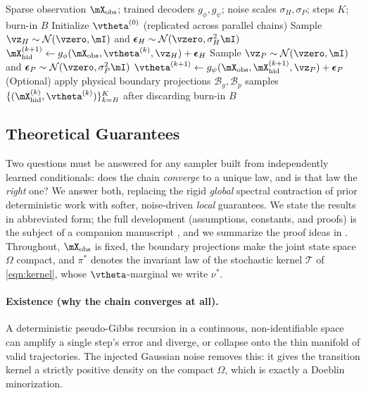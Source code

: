 \begin{algorithm}[htbp]
\caption{Stochastic Pseudo-Gibbs Inference}
\label{alg:pseudo_gibbs}
\begin{algorithmic}[1]
\REQUIRE Sparse observation $\mX_{\mathrm{obs}}$; trained decoders $g_\phi, g_\psi$; noise scales $\sigma_H, \sigma_P$; steps $K$; burn-in $B$
\STATE Initialize $\vtheta^{(0)}$ (replicated across parallel chains)
\STATE Sample $\vz_H \sim \mathcal{N}(\vzero, \mI)$ and $\boldsymbol{\epsilon}_H \sim \mathcal{N}(\vzero, \sigma_H^2 \mI)$
\STATE $\mX_{\mathrm{hid}}^{(k+1)} \leftarrow g_\phi(\mX_{\mathrm{obs}}, \vtheta^{(k)}, \vz_H) + \boldsymbol{\epsilon}_H$
\STATE Sample $\vz_P \sim \mathcal{N}(\vzero, \mI)$ and $\boldsymbol{\epsilon}_P \sim \mathcal{N}(\vzero, \sigma_P^2 \mI)$
\STATE $\vtheta^{(k+1)} \leftarrow g_\psi(\mX_{\mathrm{obs}}, \mX_{\mathrm{hid}}^{(k+1)}, \vz_P) + \boldsymbol{\epsilon}_P$
\STATE (Optional) apply physical boundary projections $\mathcal{B}_y, \mathcal{B}_p$
\ENDFOR
\RETURN samples $\{(\mX_{\mathrm{hid}}^{(k)}, \vtheta^{(k)})\}_{k=B}^{K}$ after discarding burn-in $B$
\end{algorithmic}
\end{algorithm}

\subsection{Theoretical Guarantees}
\label{subsec:theory}

Two questions must be answered for any sampler built from independently learned conditionals: does
the chain \emph{converge} to a unique law, and is that law the \emph{right} one? We answer both,
replacing the rigid \emph{global} spectral contraction of prior deterministic work with softer,
noise-driven \emph{local} guarantees. We state the results in abbreviated form; the full development
(assumptions, constants, and proofs) is the subject of a companion manuscript
\citep{adcvae-theory}, and we summarize the proof ideas in . Throughout, $\xobs$
is fixed, the boundary projections make the joint state space $\Omega$ compact, and $\pi^\ast$
denotes the invariant law of the stochastic kernel $\mathcal{T}$ of \eqref{eqn:kernel}, whose
$\vtheta$-marginal we write $\nu^\ast$.

\paragraph{Existence (why the chain converges at all).}
A deterministic pseudo-Gibbs recursion in a continuous, non-identifiable space can amplify a single
step's error and diverge, or collapse onto the thin manifold of valid trajectories. The injected
Gaussian noise removes this: it gives the transition kernel a strictly positive density on the
compact $\Omega$, which is exactly a Doeblin minorization.


